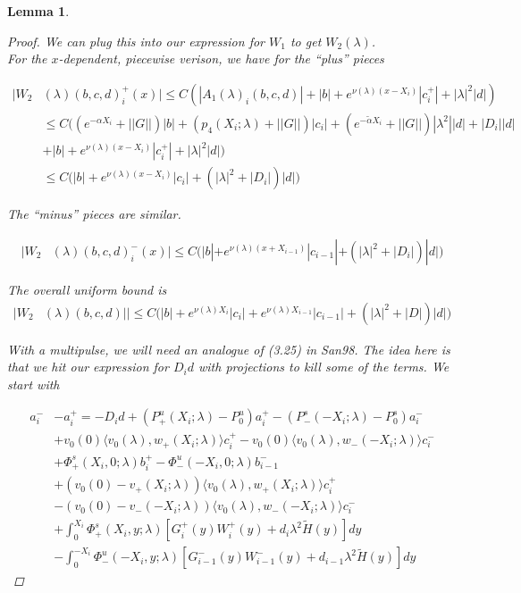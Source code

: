 \documentclass[12pt]{article}
\newtheorem{lemma}{Lemma}
\begin{document}
\begin{lemma}
\begin{proof}
We can plug this into our expression for $W_1$ to get $W_2(\lambda)$.\\

For the $x$-dependent, piecewise verison, we have for the ``plus'' pieces

\begin{align*}
|W_2&(\lambda)(b,c,d)_i^+(x)| \leq C ( |A_1(\lambda)_i(b, c, d)| + |b| + e^{\nu(\lambda)(x - X_i)}|c_i^+| + |\lambda|^2 |d| ) \\
&\leq C \Big( (e^{-\alpha X_i} + ||G||)|b| + ( p_4(X_i; \lambda) + ||G|| )|c_i|
+ (e^{-\tilde{\alpha} X_i} + ||G||) |\lambda^2| |d| + |D_i||d| \\
&+ |b| + e^{\nu(\lambda)(x - X_i)}|c_i^+| + |\lambda|^2 |d| \Big)\\
&\leq C \Big( |b| + e^{\nu(\lambda)(x - X_i)}|c_i| + (|\lambda|^2 + |D_i|)|d| \Big)
\end{align*}

The ``minus'' pieces are similar.

\begin{align*}
|W_2&(\lambda)(b,c,d)_i^-(x)| 
\leq C \Big( |b| + e^{\nu(\lambda)(x + X_{i-1})}|c_{i-1}| + (|\lambda|^2 + |D_i|)|d| \Big)
\end{align*}

The overall uniform bound is
\begin{align*}
|W_2&(\lambda)(b,c,d)|| 
\leq C \Big( |b| + e^{\nu(\lambda)X_i}|c_i| + e^{\nu(\lambda)X_{i-1}}|c_{i-1}| + (|\lambda|^2 + |D|)|d| \Big)
\end{align*}

With a multipulse, we will need an analogue of (3.25) in San98. The idea here is that we hit our expression for $D_i d$ with projections to kill some of the terms. We start with

\begin{align*}
a_i^- &- a_i^+ = -D_i d + (P^u_+(X_i; \lambda) - P_0^u)a_i^+ - (P^s_-(-X_i; \lambda) - P_0^s)a_i^- \\
&+ v_0(0) \langle v_0(\lambda), w_+(X_i; \lambda) \rangle c_i^+ 
- v_0(0) \langle v_0(\lambda), w_-(-X_i; \lambda) \rangle c_i^- \\
&+ \Phi^s_+(X_i, 0; \lambda)b_i^+ - \Phi^u_-(-X_i, 0; \lambda)b_{i-1}^- \\
&+ (v_0(0) - v_+(X_i; \lambda)) \langle v_0(\lambda), w_+(X_i; \lambda) \rangle c_i^+ \\
&- (v_0(0) - v_-(-X_i; \lambda)) \langle v_0(\lambda), w_-(-X_i; \lambda) \rangle c_i^- \\
&+ \int_0^{X_i} \Phi^s_+(X_i, y; \lambda) [ G_i^+(y) W_i^+(y) + d_i \lambda^2 \tilde{H}(y) ] dy \\
&- \int_0^{-X_i} \Phi^u_-(-X_i, y; \lambda) [ G_{i-1}^-(y) W_{i-1}^-(y) + d_{i-1} \lambda^2 \tilde{H}(y) ] dy 
\end{align*}


\end{proof}
\end{lemma}
\end{document}
